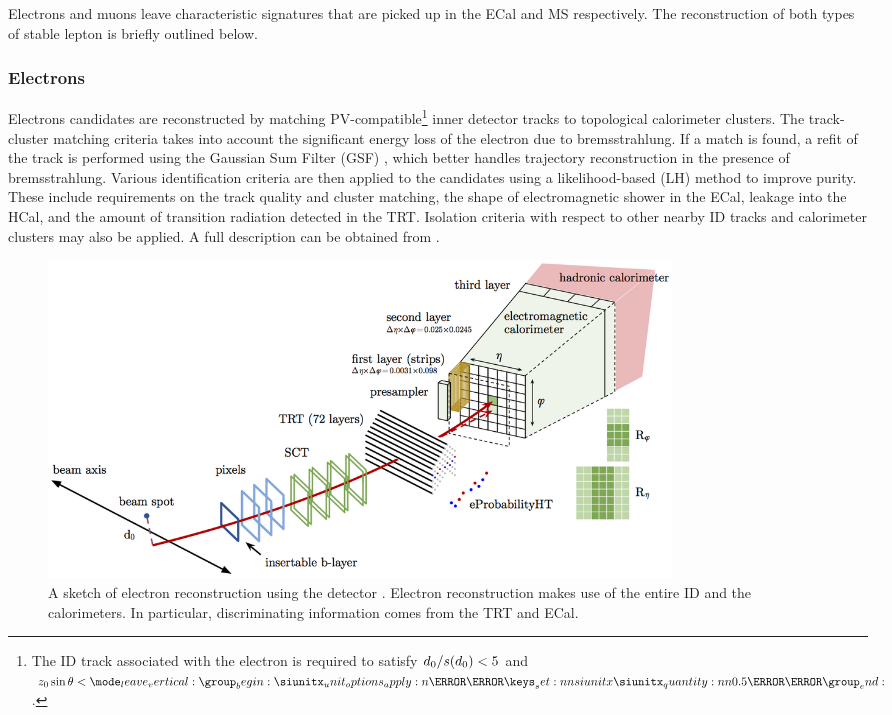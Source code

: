Electrons and muons leave characteristic signatures that are picked up in the ECal and MS respectively.
The reconstruction of both types of stable lepton is briefly outlined below.

\subsubsection{Electrons}

Electrons candidates are reconstructed by matching PV-compatible\footnote{The ID track associated with the electron is required to satisfy $d_{0} / s(d_0) < 5$ and $\zzero\sin\theta < \SI{0.5}{\milli\meter}$.} inner detector tracks to topological calorimeter clusters.
The track-cluster matching criteria takes into account the significant energy loss of the electron due to bremsstrahlung.
If a match is found, a refit of the track is performed using the Gaussian Sum Filter (GSF) \cite{ATLAS-CONF-2012-047}, which better handles trajectory reconstruction in the presence of bremsstrahlung.
Various identification criteria are then applied to the candidates using a likelihood-based (LH) method to improve purity.
These include requirements on the track quality and cluster matching, the shape of electromagnetic shower in the ECal, leakage into the HCal, and the amount of transition radiation detected in the TRT.
Isolation criteria with respect to other nearby ID tracks and calorimeter clusters may also be applied.
A full description can be obtained from .
%
\begin{figure}[!htbp]
  \centering
  \includegraphics[width=0.8\textwidth]{chapters/2.detector/figs/electron_reco.png}
  \caption{
    A sketch of electron reconstruction using the \ATLAS detector \cite{ATLAS-CONF-2016-024}.
    Electron reconstruction makes use of the entire ID and the calorimeters.
    In particular, discriminating information comes from the TRT and ECal.
  }
  \label{fig:electron_Reco}
\end{figure}
%


